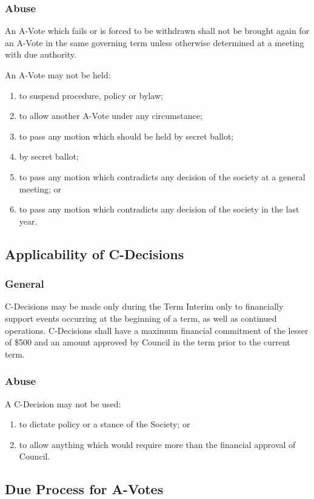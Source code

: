 \subsubsection{Abuse}
An A-Vote which fails or is forced to be withdrawn shall not be brought again for an A-Vote in the same governing term unless otherwise determined at a meeting with due authority.

An A-Vote may not be held:
\begin{enumerate}
    \item to suspend procedure, policy or bylaw;
    \item to allow another A-Vote under any circumstance;
    \item to pass any motion which should be held by secret ballot;
    \item by secret ballot;
    \item to pass any motion which contradicts any decision of the society at a general meeting; or
    \item to pass any motion which contradicts any decision of the society in the last year.
\end{enumerate}

\subsection{Applicability of C-Decisions}

\subsubsection{General}
C-Decisions may be made only during the Term Interim only to financially support events occurring at the beginning of a term, as well as continued operations.
C-Decisions shall have a maximum financial commitment of the lesser of \$500 and an amount approved by Council in the term prior to the current term.

\subsubsection{Abuse}
A C-Decision may not be used:
\begin{enumerate}
    \item to dictate policy or a stance of the Society; or 
    \item to allow anything which would require more than the financial approval of Council. 
\end{enumerate}

\subsection{Due Process for A-Votes}

